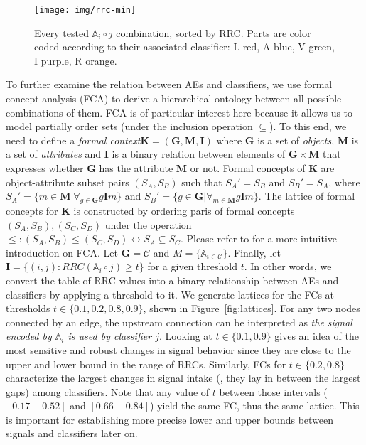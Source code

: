 \documentclass[10pt,twocolumn,a4paper]{article}
\newcommand{\autoe}[1]{\mathbb{A}_{#1}}
\newcommand{\clf}[1]{#1}
\newcommand{\nn}[2]{\autoe{#1}\circ\clf{#2}}
\begin{document}
\begin{figure}
	\texttt{[image: img/rrc-min]}
	\caption{Every tested $\nn{i}{j}$ combination, sorted by RRC. Parts are color coded according to their associated classifier: L red, A blue, V green, I purple, R orange.}
	\label{fig:rrc-min}
\end{figure}

To further examine the relation between AEs and classifiers, we use formal concept analysis (FCA) \cite{wille1982restructuring} to derive a hierarchical ontology between all possible combinations of them.
FCA is of particular interest here because it allows us to model partially order sets (under the inclusion operation $\subseteq$).
To this end, we need to define a \textit{formal context}$\mathbf{K} = (\mathbf{G}, \mathbf{M}, \mathbf{I})$ where $\mathbf{G}$ is a set of \textit{objects}, $\mathbf{M}$ is a set of \textit{attributes} and $\mathbf{I}$ is a binary relation between elements of $\mathbf{G}\times \mathbf{M}$ that expresses whether $\mathbf{G}$ has the attribute $\mathbf{M}$ or not.
Formal concepts of $\mathbf{K}$ are object-attribute subset pairs $(S_A, S_B)$ such that $S_A' = S_B$ and $S_B' = S_A$, where $S_A' = \{m \in \mathbf{M} | \forall_{g\in \mathbf{G}} g\mathbf{I}m \}$ and $S_B' = \{g \in \mathbf{G} | \forall_{m\in \mathbf{M}} g\mathbf{I}m\}$.
The lattice of formal concepts for $\mathbf{K}$ is constructed by ordering paris of formal concepts $(S_A, S_B), (S_C, S_D)$ under the operation $\le: (S_A, S_B)\le (S_C, S_D) \leftrightarrow S_A \subseteq S_C$.
Please refer to \cite{wolff1993first} for a more intuitive introduction on FCA.
Let $\mathbf{G} = \mathcal{C}$ and $M = \{\autoe{i \in \mathcal{C}}\}$.
Finally, let $\mathbf{I} = \{(i, j): RRC(\nn{i}{j}) \ge t\}$ for a given threshold $t$.
In other words, we convert the table of RRC values into a binary relationship between AEs and classifiers by applying a threshold to it.
We generate lattices for the FCs at thresholds $t\in\{0.1, 0.2, 0.8, 0.9\}$, shown in Figure~\ref{fig:lattices}.
For any two nodes connected by an edge, the upstream connection can be interpreted as \emph{the signal encoded by $\autoe{i}$ is used by classifier $j$}.
Looking at $t\in \{0.1, 0.9\}$ gives an idea of the most sensitive and robust changes in signal behavior since they are close to the upper and lower bound in the range of RRCs.
Similarly, FCs for $t\in \{0.2, 0.8\}$ characterize the largest changes in signal intake (\ie, they lay in between the largest gaps) among classifiers.
Note that any value of $t$ between those intervals ($[0.17 - 0.52]$ and $[0.66 - 0.84]$) yield the same FC, thus the same lattice.
This is important for establishing more precise lower and upper bounds between signals and classifiers later on.
\end{document}
